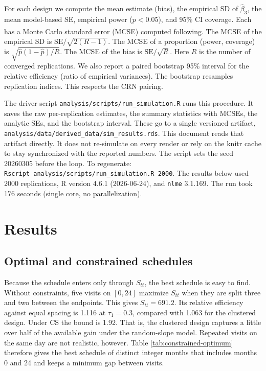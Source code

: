\documentclass[
  11pt,
]{article}
\begin{document}
For each design we compute the mean estimate (bias), the empirical
SD of \(\hat{\beta}_3\), the mean model-based SE, empirical power
(\(p < 0.05\)), and 95\% CI coverage. Each has a Monte Carlo
standard error (MCSE) computed following\textsuperscript{}.
The MCSE of the empirical SD is \(\text{SE} / \sqrt{2(R-1)}\). The
MCSE of a proportion (power, coverage) is
\(\sqrt{\hat p (1-\hat p) / R}\). The MCSE of the bias is
\(\text{SE} / \sqrt{R}\). Here \(R\) is the number of converged
replications. We also report a paired bootstrap 95\% interval for
the relative efficiency (ratio of empirical variances). The
bootstrap resamples replication indices. This respects the CRN
pairing.

The driver script \texttt{analysis/scripts/run\_simulation.R} runs this
procedure. It saves the raw per-replication estimates, the
summary statistics with MCSEs, the analytic SEs, and the
bootstrap interval. These go to a single versioned artifact,
\texttt{analysis/data/derived\_data/sim\_results.rds}. This document reads
that artifact directly. It does not re-simulate on every render
or rely on the knitr cache to stay synchronized with the reported
numbers. The script sets the seed
20260305 before the loop. To regenerate:
\texttt{Rscript\ analysis/scripts/run\_simulation.R\ 2000}. The results below
used 2000 replications, R version 4.6.1 (2026-06-24),
and \texttt{nlme} 3.1.169. The run took
176 seconds
(single core, no parallelization).

\section{Results}\label{results}

\subsection{Optimal and constrained schedules}\label{optimal-and-constrained-schedules}

Because the schedule enters only through \(S_{tt}\), the best
schedule is easy to find. Without constraints, five visits on
\([0, 24]\) maximize \(S_{tt}\) when they are split three
and two between the endpoints. This gives \(S_{tt} =
691.2\). Its relative efficiency against equal
spacing is 1.116 at
\(\tau_1 = 0.3\), compared with
1.063 for the clustered
design. Under CS the bound is 1.92.
That is, the clustered design captures a little over half of the
available gain under the random-slope model. Repeated visits on
the same day are not realistic, however. Table
\ref{tab:constrained-optimum} therefore gives the best schedule of
distinct integer months that includes months 0 and
24 and keeps a minimum gap between visits.
\end{document}
